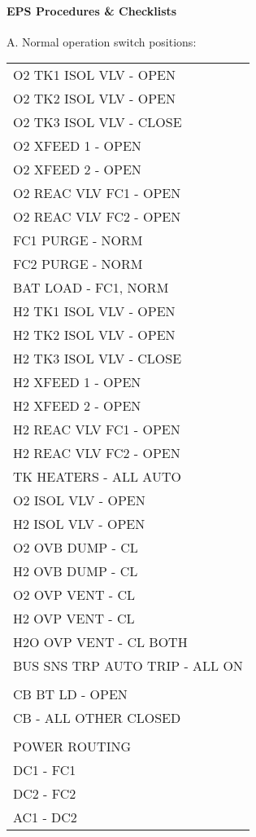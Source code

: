 \documentclass[Orbiter User Manual.tex]{subfiles}
\begin{document}
\paragraph{EPS Procedures \& Checklists}
A. Normal operation switch positions:
	\begin{longtable}{ p{\textwidth} }
	O2 TK1 ISOL VLV - OPEN\\
	O2 TK2 ISOL VLV - OPEN\\
	O2 TK3 ISOL VLV - CLOSE\\
	O2 XFEED 1 - OPEN\\
	O2 XFEED 2 - OPEN\\
	O2 REAC VLV FC1 - OPEN\\
	O2 REAC VLV FC2 - OPEN\\
	FC1 PURGE - NORM\\
	FC2 PURGE - NORM\\
	BAT LOAD - FC1, NORM\\
	H2 TK1 ISOL VLV - OPEN\\
	H2 TK2 ISOL VLV - OPEN\\
	H2 TK3 ISOL VLV - CLOSE\\
	H2 XFEED 1 - OPEN\\
	H2 XFEED 2 - OPEN\\
	H2 REAC VLV FC1 - OPEN\\
	H2 REAC VLV FC2 - OPEN\\
	TK HEATERS - ALL AUTO\\
	O2 ISOL VLV - OPEN\\
	H2 ISOL VLV - OPEN\\
	O2 OVB DUMP - CL\\
	H2 OVB DUMP - CL\\
	O2 OVP VENT - CL\\
	H2 OVP VENT - CL\\
	H2O OVP VENT - CL BOTH\\
	BUS SNS TRP AUTO TRIP - ALL ON\\
	\\
	CB BT LD - OPEN\\
	CB - ALL OTHER CLOSED\\
	\\
	POWER ROUTING\\
	\quad DC1 - FC1\\
	\quad DC2 - FC2\\
	\quad AC1 - DC2\\
	\end{longtable}
\end{document}
